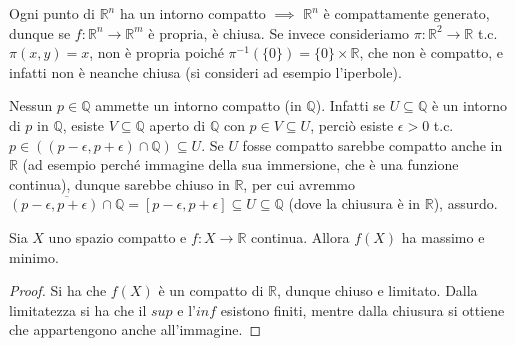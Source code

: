\begin{ex}
  Ogni punto di $\mathbb{R}^n$ ha un intorno compatto $\implies$ $\mathbb{R}^n$ è compattamente generato, dunque se $f:\mathbb{R}^n \rightarrow \mathbb{R}^m$ è propria, è chiusa.
  Se invece consideriamo $\pi: \mathbb{R}^2 \rightarrow \mathbb{R}$ t.c. $\pi(x, y)=x$, non è propria poiché $\pi^{-1}(\{0\})=\{0\} \times \mathbb{R}$, che non è compatto, e infatti non è neanche chiusa (si consideri ad esempio l'iperbole).
\end{ex}

\begin{ex}
  Nessun $p \in \mathbb{Q}$ ammette un intorno compatto (in $\mathbb{Q}$). Infatti se $U \subseteq \mathbb{Q}$ è un intorno di $p$ in $\mathbb{Q}$, esiste $V \subseteq \mathbb{Q}$ aperto di $\mathbb{Q}$ con $p \in V \subseteq U$,
  perciò esiste $\epsilon>0$ t.c. $p \in ((p-\epsilon, p+\epsilon) \cap \mathbb{Q}) \subseteq U$. Se $U$ fosse compatto sarebbe compatto anche in $\mathbb{R}$ (ad esempio perché immagine della sua immersione, che è una funzione continua), dunque sarebbe chiuso in $\mathbb{R}$,
  per cui avremmo $\overline{(p-\epsilon, p+\epsilon) \cap \mathbb{Q}}=[p-\epsilon, p+\epsilon] \subseteq U \subseteq \mathbb{Q}$ (dove la chiusura è in $\mathbb{R}$), assurdo.
\end{ex}

\begin{thm}
Sia $X$ uno spazio compatto e $f:X\longrightarrow \mathbb{R}$ continua. Allora $f(X)$ ha massimo e minimo.
\end{thm}
\begin{proof}
Si ha che $f(X)$ \`e un compatto di $\mathbb{R}$, dunque chiuso e limitato. Dalla limitatezza si ha che il $sup$ e l'$inf$ esistono finiti, mentre dalla chiusura si ottiene che appartengono anche all'immagine.
\end{proof}
